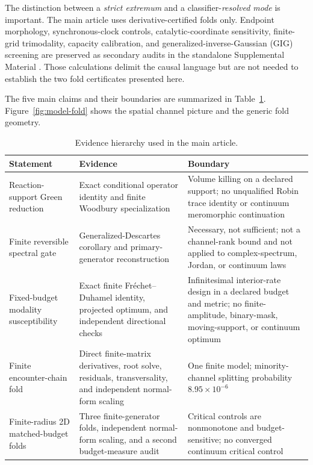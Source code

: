 \documentclass[aps,pre,reprint,amsmath,amssymb,longbibliography,floatfix]{revtex4-2}
\begin{document}
The distinction between a \emph{strict extremum} and a
classifier-\emph{resolved mode} is important. The main article uses
derivative-certified folds only. Endpoint morphology, synchronous-clock
controls, catalytic-coordinate sensitivity, finite-grid trimodality,
capacity calibration, and generalized-inverse-Gaussian (GIG) screening are
preserved as secondary audits in the standalone Supplemental Material
\cite{supplementalMaterial}. Those calculations delimit the causal language
but are not needed to establish the two fold certificates presented here.

The five main claims and their boundaries are summarized in
Table~\ref{tab:evidence}. Figure~\ref{fig:model-fold} shows the spatial
channel picture and the generic fold geometry.

\begin{table}[!t]
\caption{\label{tab:evidence}
Evidence hierarchy used in the main article.}
\begin{ruledtabular}
\begin{tabular}{p{}p{}p{}}
Statement & Evidence & Boundary\\
\hline
Reaction-support Green reduction
& Exact conditional operator identity and finite Woodbury specialization
& Volume killing on a declared support; no unqualified Robin trace identity or
continuum meromorphic continuation\\
Finite reversible spectral gate
& Generalized-Descartes corollary and primary-generator reconstruction
& Necessary, not sufficient; not a channel-rank bound and not applied to
complex-spectrum, Jordan, or continuum laws\\
Fixed-budget modality susceptibility
& Exact finite Fr\'echet--Duhamel identity, projected optimum, and independent
directional checks
& Infinitesimal interior-rate design in a declared budget and metric; no
finite-amplitude, binary-mask, moving-support, or continuum optimum\\
Finite encounter-chain fold
& Direct finite-matrix derivatives, root solve, residuals, transversality, and
independent normal-form scaling
& One finite model; minority-channel splitting probability
\(8.95\times10^{-6}\)\\
Finite-radius 2D matched-budget folds
& Three finite-generator folds, independent normal-form scaling, and a second
budget-measure audit
& Critical controls are nonmonotone and budget-sensitive; no converged
continuum critical control\\
\end{tabular}
\end{ruledtabular}
\end{table}
\end{document}
